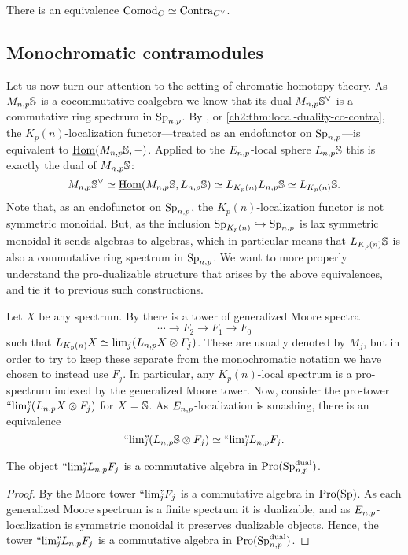 \begin{corollary}
    There is an equivalence $\Comod_C \simeq \Contra_{C^\vee}$. 
\end{corollary}


\subsection{Monochromatic contramodules}

Let us now turn our attention to the setting of chromatic homotopy theory. As $M\np\S$ is a cocommutative coalgebra we know that its dual $M\np\S^\vee$ is a commutative ring spectrum in $\Sp\np$. By \cite[2.21(4)]{barthel-heard-valenzuela_2018}, or \cref{ch2:thm:local-duality-co-contra}, the $K_p(n)$-localization functor---treated as an endofunctor on $\Sp\np$---is equivalent to $\iHom(M\np\S,-)$. Applied to the $E\np$-local sphere $L\np\S$ this is exactly the dual of $M\np\S$:
\[M\np \S^\vee \simeq \iHom(M\np\S, L\np\S)\simeq L_\Kpn L\np\S \simeq L_\Kpn\S.\]
Note that, as an endofunctor on $\Sp\np$, the $K_p(n)$-localization functor is not symmetric monoidal. But, as the inclusion $\Sp_\Kpn\hookrightarrow \Sp\np$ is lax symmetric monoidal it sends algebras to algebras, which in particular means that $L_\Kpn\S$ is also a commutative ring spectrum in $\Sp\np$. We want to more properly understand the pro-dualizable structure that arises by the above equivalences, and tie it to previous such constructions. 

\begin{construction}
    Let $X$ be any spectrum. By \cite[4.22, 7.10(e)]{hovey-strickland_99} there is a tower of generalized Moore spectra 
    \[\cdots \to F_2 \to F_1 \to F_0\]
    such that $L_\Kpn X \simeq \lim_j (L\np X \otimes F_j)$. These are usually denoted by $M_j$, but in order to try to keep these separate from the monochromatic notation we have chosen to instead use $F_j$. In particular, any $K_p(n)$-local spectrum is a pro-spectrum indexed by the generalized Moore tower. Now, consider the pro-tower $\prolim (L\np X \otimes F_j)$ for $X=\S$. As $E\np$-localization is smashing, there is an equivalence 
    \[\prolim (L\np \S \otimes F_j)\simeq \prolim L\np F_j.\]
\end{construction}

\begin{lemma}
    \label{ch2:lm:Moore-tower-in-local-dualizable}
    The object $\prolim L\np F_j$ is a commutative algebra in $\Pro(\Sp\np\dual)$. 
\end{lemma}
\begin{proof}
    By \cite[6.3]{davis-lawson_2014} the Moore tower $\prolim F_j$ is a commutative algebra in $\Pro(\Sp)$. As each generalized Moore spectrum is a finite spectrum it is dualizable, and as $E\np$-localization is symmetric monoidal it preserves dualizable objects. Hence, the tower $\prolim L\np F_j$ is a commutative algebra in $\Pro(\Sp\np\dual)$. 
\end{proof}

